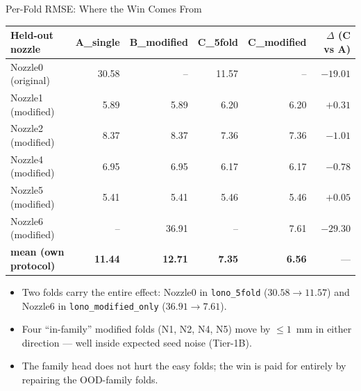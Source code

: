 \documentclass[UTF8,aspectratio=169]{ctexbeamer}
\newcommand{\good}[1]{\textcolor{green!45!black}{#1}}
\newcommand{\warn}[1]{\textcolor{red!65!black}{#1}}
\begin{document}
\begin{frame}{Per-Fold RMSE: Where the Win Comes From}
\footnotesize
\begin{center}
\renewcommand{\arraystretch}{1.10}
\setlength{\tabcolsep}{4pt}
\begin{tabular}{@{}lrrrrr@{}}
\toprule
\textbf{Held-out nozzle} & \textbf{A\_single} & \textbf{B\_modified} & \textbf{C\_5fold} & \textbf{C\_modified} & \textbf{$\Delta$ (C vs A)} \\
\midrule
\rowcolor{warnrow}
Nozzle0 (original)       & \warn{30.58} & --            & \good{11.57}  & --            & \good{$-19.01$} \\
Nozzle1 (modified)       & 5.89         & 5.89          & 6.20          & 6.20          & $+0.31$ \\
Nozzle2 (modified)       & 8.37         & 8.37          & 7.36          & 7.36          & $-1.01$ \\
Nozzle4 (modified)       & 6.95         & 6.95          & 6.17          & 6.17          & $-0.78$ \\
Nozzle5 (modified)       & 5.41         & 5.41          & 5.46          & 5.46          & $+0.05$ \\
\rowcolor{warnrow}
Nozzle6 (modified)       & --           & \warn{36.91}  & --            & \good{7.61}   & \good{$-29.30$} \\
\midrule
\textbf{mean (own protocol)} & \textbf{11.44} & \textbf{12.71} & \textbf{7.35} & \textbf{6.56} & --- \\
\bottomrule
\end{tabular}
\end{center}

\vspace{0.4em}
\begin{itemize}\setlength\itemsep{2pt}
  \item Two folds carry the entire effect: Nozzle0 in \texttt{lono\_5fold}
        ($30.58 \to 11.57$) and Nozzle6 in \texttt{lono\_modified\_only}
        ($36.91 \to 7.61$).
  \item Four ``in-family'' modified folds (N1, N2, N4, N5) move by $\leq 1$~mm
        in either direction — well inside expected seed noise (Tier-1B).
  \item The family head does not hurt the easy folds; the win is paid for entirely
        by repairing the OOD-family folds.
\end{itemize}
\end{frame}
\end{document}
